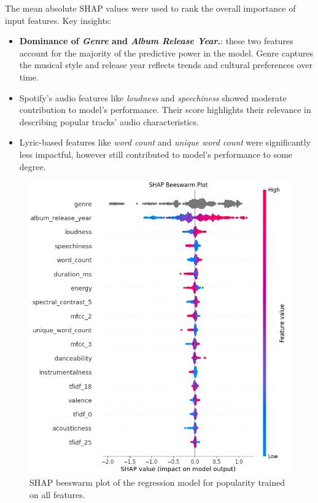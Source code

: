 The mean absolute SHAP values were used to rank the overall importance of input
features. Key insights:
\begin{itemize}
  \item \textbf{Dominance of \textit{Genre} and \textit{Album Release Year}.}:
    these two features account for the majority of the predictive power in the
    model. Genre captures the musical style and release year reflects trends
    and cultural preferences over time.
  \item Spotify's audio features like \textit{loudness} and
    \textit{speechiness} showed moderate contribution to model's performance.
    Their score highlights their relevance in describing popular tracks' audio
    characteristics.
  \item Lyric-based features like \textit{word count} and \textit{unique word
    count} were significantly less impactful, however still contributed to
    model's performance to some degree.
\end{itemize}

\begin{center}
\begin{figure}[H]
  \centering
  \includegraphics[width=5in]{img/beeswarm_popularity_reg.png}
  \caption{SHAP beeswarm plot of the regression model for popularity trained on all features.}
  \label{Figure:fig_beh}
\end{figure}
\end{center}

